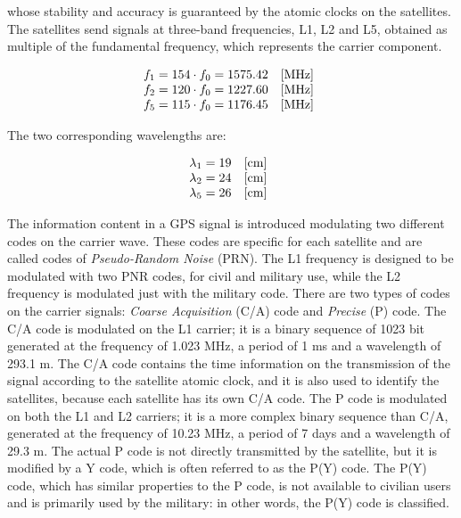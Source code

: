 whose stability and accuracy is guaranteed by the atomic clocks on the satellites. 
The satellites send signals at three-band frequencies, L1, L2 and L5, obtained as multiple of the fundamental frequency, which represents the carrier component.

\begin{equation} 
	\begin{matrix} 
		f_{1} = 154\cdot f_{0} = 1575.42 & [\unit{MHz}]\\ 
		f_{2} = 120\cdot f_{0} = 1227.60 & [\unit{MHz}] \\
		f_{5} = 115\cdot f_{0} = 1176.45 & [\unit{MHz}] \end{matrix} 
	\\
	\label{eq:f12GPS}
\end{equation}

The two corresponding wavelengths are:

\begin{equation} 
	\begin{matrix} 
		\lambda_{1} = 19 & [\unit{cm}]\\ \lambda_{2} = 24  & [\unit{cm}]\\
		\lambda_{5} = 26  & [\unit{cm}]\end{matrix} 
	\\
	\label{eq:lambda12GPS}
\end{equation}

The information content in a GPS signal is introduced modulating two different codes on the carrier wave. These codes are specific for each satellite and are called codes of \textit{Pseudo-Random Noise} (PRN). The L1 frequency is designed to be modulated with two PNR codes, for civil and military use, while the L2 frequency is modulated just with the military code. There are two types of codes on the carrier signals: \textit{Coarse Acquisition} (C/A) code and \textit{Precise} (P) code. The C/A code is modulated on the L1 carrier; it is a binary sequence of 1023 bit generated at the
frequency of 1.023 MHz, a period of 1 ms and a wavelength of 293.1 m. The C/A code contains the time information on the transmission of the signal according to the satellite atomic clock, and it is also used to identify the satellites, because each satellite has its own C/A code.
The P code is modulated on both the L1 and L2 carriers; it is a more complex binary sequence than C/A, generated at the frequency of 10.23 MHz, a period of 7 days and a wavelength of 29.3 m. The actual P code is not directly transmitted by the satellite, but it is modified by a Y code, which is often referred to as the P(Y) code. The P(Y) code, which has similar properties to the P code, is not available to civilian users and is primarily used by the military: in other words, the P(Y) code is classified. 

